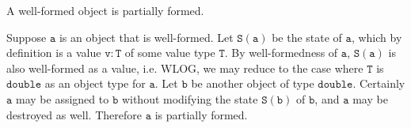 \begin{Lemma}
    A well-formed object is partially formed.
\end{Lemma}

\begin{solution}
    Suppose $\mathtt{a}$ is an object that is well-formed. Let $\mathtt{S(a)}$ 
    be the state of $\mathtt{a}$, which by definition is a value $\mathtt{v : T}$ of 
    some value type $\mathtt{T}$. By well-formedness of $\mathtt{a}$, $\mathtt{S(a)}$ is 
    also well-formed as a value, i.e. WLOG, we may reduce to the case where 
    $\mathtt{T}$ is $\mathtt{double}$ as an object type for $\mathtt{a}$. Let $\mathtt{b}$ 
    be another object of type $\mathtt{double}$. Certainly $\mathtt{a}$ may be assigned to 
    $\mathtt{b}$ without modifying the state $\mathtt{S(b)}$ of $\mathtt{b}$, and 
    $\mathtt{a}$ may be destroyed as well. Therefore $\mathtt{a}$ is partially formed.
\end{solution}